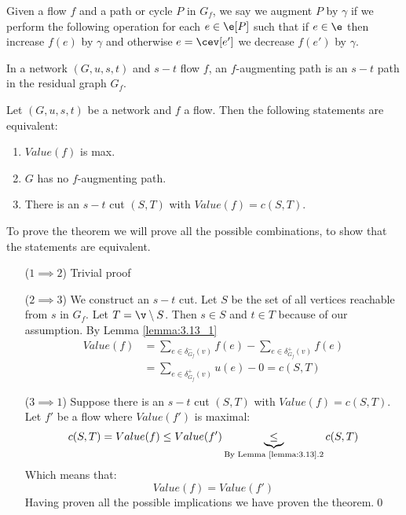 Given a flow $f$ and a path or cycle $P$ in $G_f$, we say we augment $P$ by $\gamma$ if we perform the following operation for each $e \in \e[P]$ such that if $e \in \e$ then increase $f(e)$ by $\gamma$ and otherwise $e = \cev[e']$ we decrease $f(e')$ by $\gamma$.

In a network $(G, u, s, t)$ and $s - t$ flow $f$, an $f$-augmenting path is an $s - t$ path in the residual graph $G_f$.
\begin{customtheorem}{3.1}
\label{theorem:3.1}
    Let $(G, u, s, t)$ be a network and $f$ a flow. Then the following statements are equivalent:
    \begin{enumerate}
        \item $Value(f)$ is max.
        \item $G$ has no $f$-augmenting path.
        \item There is an $s - t$ cut $(S, T)$ with $Value(f) = c(S, T)$.
    \end{enumerate}
\end{customtheorem}
\begin{prf}
    To prove the theorem we will prove all the possible combinations, to show that the statements are equivalent.
    \begin{itemize}
        \item[($1 \implies 2$)] Trivial proof
        \item[($2 \implies 3$)] We construct an $s - t$ cut. Let $S$ be the set of all vertices reachable from $s$ in $G_f$. Let $T = \v \setminus S$. Then $s \in S$ and $t \in T$ because of our assumption. By Lemma \ref{lemma:3.13_1}
        \begin{align*}
            Value(f) &= \sum_{e \in \delta^-_{G_f}(v)}f(e) - \sum_{e \in \delta^+_{G_f}(v)}f(e)\\
                     &= \sum_{e \in \delta^+_{G_f}(v)} u(e) - 0 = c(S, T)
        \end{align*}
        \item[($3 \implies 1$)] Suppose there is an $s - t$ cut $(S, T)$ with $Value(f) = c(S, T)$. Let $f'$ be a flow where $Value(f')$ is maximal:
        \begin{equation*}
            c(S, T) = Value(f) \leq Value(f') \underbrace{\leq}_{\text{By Lemma \ref{lemma:3.13}.2}} c(S, T)
        \end{equation*}
        Which means that:
        \begin{equation*}
            Value(f) = Value(f')
        \end{equation*}
        Having proven all the possible implications we have proven the theorem.\qed
    \end{itemize}
\end{prf}
